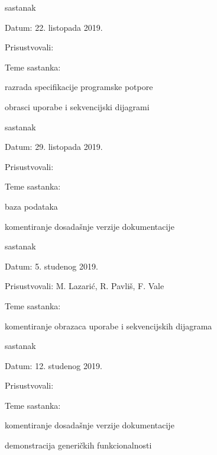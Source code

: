 \begin{packed_enum}
			\item  sastanak
			\item[] \begin{packed_item}
				\item Datum: 22. listopada 2019.
				\item Prisustvovali: \imenaSvihClanova
				\item Teme sastanka:
				\begin{packed_item}
					\item razrada specifikacije programske potpore
					\item obrasci uporabe i sekvencijski dijagrami
				\end{packed_item}
			\end{packed_item}
		
			\item  sastanak
			\item[] \begin{packed_item}
				\item Datum: 29. listopada 2019.
				\item Prisustvovali: \imenaSvihClanova
				\item Teme sastanka:
				\begin{packed_item}
					\item baza podataka
					\item komentiranje dosadašnje verzije dokumentacije
				\end{packed_item}
			\end{packed_item}
		
			\item  sastanak
			\item[] \begin{packed_item}
				\item Datum: 5. studenog 2019.
				\item Prisustvovali: M. Lazarić, R. Pavliš, F. Vale
				\item Teme sastanka:
				\begin{packed_item}
					\item komentiranje obrazaca uporabe i sekvencijskih dijagrama
				\end{packed_item}
			\end{packed_item}
		
			\item  sastanak
			\item[] \begin{packed_item}
				\item Datum: 12. studenog 2019.
				\item Prisustvovali: \imenaSvihClanova
				\item Teme sastanka:
				\begin{packed_item}
					\item komentiranje dosadašnje verzije dokumentacije
					\item demonstracija generičkih funkcionalnosti
				\end{packed_item}
			\end{packed_item}
			
			
		\end{packed_enum}
		
